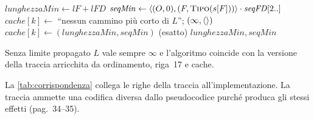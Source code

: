 \begin{algorithm}[tbp]
\begin{algorithmic}[1]
      \State $\mathit{lunghezzaMin} \gets \mathit{lF} + \mathit{lFD}$
      \State $\mathit{seqMin} \gets \seq{(O,0), (F, \Call{Tipo}{s[F]})} \cdot \mathit{seqFD}[2..]$ 
    \EndIf
  \EndFor
   
    \State $\mathit{cache}[k] \gets$ ``nessun cammino più corto di $L$''; \quad \Return $(\infty, \langle  \rangle)$
  \EndIf
  \State $\mathit{cache}[k] \gets (\mathit{lunghezzaMin}, \mathit{seqMin})$ (esatto)
  \State \Return $\mathit{lunghezzaMin}, \mathit{seqMin}$
\EndFunction
\end{algorithmic}
\end{algorithm}

Senza limite propagato $L$ vale sempre $\infty$ e l'algoritmo coincide con la
versione della traccia arricchita da ordinamento, riga~17 e cache.

La \cref{tab:corrispondenza} collega le righe della traccia
all'implementazione. La traccia ammette una codifica diversa dallo
pseudocodice purché produca gli stessi effetti (pag.~34--35).

